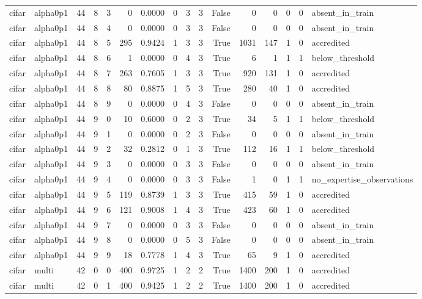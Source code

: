 \begin{tabular}{llrrrrrrrrrrrrrl}
cifar & alpha0p1 & 44 & 8 & 3 & 0 & 0.0000 & 0 & 3 & 3 & False & 0 & 0 & 0 & 0 & absent\_in\_train \\
cifar & alpha0p1 & 44 & 8 & 4 & 0 & 0.0000 & 0 & 3 & 3 & False & 0 & 0 & 0 & 0 & absent\_in\_train \\
cifar & alpha0p1 & 44 & 8 & 5 & 295 & 0.9424 & 1 & 3 & 3 & True & 1031 & 147 & 1 & 0 & accredited \\
cifar & alpha0p1 & 44 & 8 & 6 & 1 & 0.0000 & 0 & 4 & 3 & True & 6 & 1 & 1 & 1 & below\_threshold \\
cifar & alpha0p1 & 44 & 8 & 7 & 263 & 0.7605 & 1 & 3 & 3 & True & 920 & 131 & 1 & 0 & accredited \\
cifar & alpha0p1 & 44 & 8 & 8 & 80 & 0.8875 & 1 & 5 & 3 & True & 280 & 40 & 1 & 0 & accredited \\
cifar & alpha0p1 & 44 & 8 & 9 & 0 & 0.0000 & 0 & 4 & 3 & False & 0 & 0 & 0 & 0 & absent\_in\_train \\
cifar & alpha0p1 & 44 & 9 & 0 & 10 & 0.6000 & 0 & 2 & 3 & True & 34 & 5 & 1 & 1 & below\_threshold \\
cifar & alpha0p1 & 44 & 9 & 1 & 0 & 0.0000 & 0 & 2 & 3 & False & 0 & 0 & 0 & 0 & absent\_in\_train \\
cifar & alpha0p1 & 44 & 9 & 2 & 32 & 0.2812 & 0 & 1 & 3 & True & 112 & 16 & 1 & 1 & below\_threshold \\
cifar & alpha0p1 & 44 & 9 & 3 & 0 & 0.0000 & 0 & 3 & 3 & False & 0 & 0 & 0 & 0 & absent\_in\_train \\
cifar & alpha0p1 & 44 & 9 & 4 & 0 & 0.0000 & 0 & 3 & 3 & False & 1 & 0 & 1 & 1 & no\_expertise\_observations \\
cifar & alpha0p1 & 44 & 9 & 5 & 119 & 0.8739 & 1 & 3 & 3 & True & 415 & 59 & 1 & 0 & accredited \\
cifar & alpha0p1 & 44 & 9 & 6 & 121 & 0.9008 & 1 & 4 & 3 & True & 423 & 60 & 1 & 0 & accredited \\
cifar & alpha0p1 & 44 & 9 & 7 & 0 & 0.0000 & 0 & 3 & 3 & False & 0 & 0 & 0 & 0 & absent\_in\_train \\
cifar & alpha0p1 & 44 & 9 & 8 & 0 & 0.0000 & 0 & 5 & 3 & False & 0 & 0 & 0 & 0 & absent\_in\_train \\
cifar & alpha0p1 & 44 & 9 & 9 & 18 & 0.7778 & 1 & 4 & 3 & True & 65 & 9 & 1 & 0 & accredited \\
cifar & multi & 42 & 0 & 0 & 400 & 0.9725 & 1 & 2 & 2 & True & 1400 & 200 & 1 & 0 & accredited \\
cifar & multi & 42 & 0 & 1 & 400 & 0.9425 & 1 & 2 & 2 & True & 1400 & 200 & 1 & 0 & accredited \\

\end{tabular}
